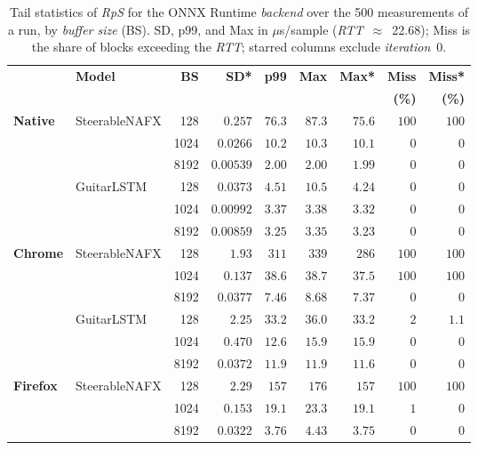 \begin{table}[htbp]
\caption{Tail statistics of \emph{RpS} for the ONNX Runtime \emph{backend} over the 500 measurements of a run, by \emph{buffer size} (BS). SD, p99, and Max in $\mu$s/sample (\emph{RTT}~$\approx$~22.68); Miss is the share of blocks exceeding the \emph{RTT}; starred columns exclude \emph{iteration}~0.}
\label{tab:tails}
\centering
\setlength{\tabcolsep}{2pt}
\begin{tabular}{llrrrrrrr}
\toprule
& \textbf{Model} & \textbf{BS} & \textbf{SD*} & \textbf{p99} & \textbf{Max} & \textbf{Max*} & \textbf{Miss} & \textbf{Miss*} \\
& & & & & & & \textbf{(\%)} & \textbf{(\%)} \\
\midrule
  \multirow{6}{*}{\textbf{Native}} & \multirow{3}{*}{SteerableNAFX} & 128 & $0.257$ & $76.3$ & $87.3$ & $75.6$ & $100$ & $100$ \\
   &  & 1024 & $0.0266$ & $10.2$ & $10.3$ & $10.1$ & $0$ & $0$ \\
   &  & 8192 & $0.00539$ & $2.00$ & $2.00$ & $1.99$ & $0$ & $0$ \\
   & \multirow{3}{*}{GuitarLSTM} & 128 & $0.0373$ & $4.51$ & $10.5$ & $4.24$ & $0$ & $0$ \\
   &  & 1024 & $0.00992$ & $3.37$ & $3.38$ & $3.32$ & $0$ & $0$ \\
   &  & 8192 & $0.00859$ & $3.25$ & $3.35$ & $3.23$ & $0$ & $0$ \\
\midrule
  \multirow{6}{*}{\textbf{Chrome}} & \multirow{3}{*}{SteerableNAFX} & 128 & $1.93$ & $311$ & $339$ & $286$ & $100$ & $100$ \\
   &  & 1024 & $0.137$ & $38.6$ & $38.7$ & $37.5$ & $100$ & $100$ \\
   &  & 8192 & $0.0377$ & $7.46$ & $8.68$ & $7.37$ & $0$ & $0$ \\
   & \multirow{3}{*}{GuitarLSTM} & 128 & $2.25$ & $33.2$ & $36.0$ & $33.2$ & $2$ & $1.1$ \\
   &  & 1024 & $0.470$ & $12.6$ & $15.9$ & $15.9$ & $0$ & $0$ \\
   &  & 8192 & $0.0372$ & $11.9$ & $11.9$ & $11.6$ & $0$ & $0$ \\
\midrule
  \multirow{6}{*}{\textbf{Firefox}} & \multirow{3}{*}{SteerableNAFX} & 128 & $2.29$ & $157$ & $176$ & $157$ & $100$ & $100$ \\
   &  & 1024 & $0.153$ & $19.1$ & $23.3$ & $19.1$ & $1$ & $0$ \\
   &  & 8192 & $0.0322$ & $3.76$ & $4.43$ & $3.75$ & $0$ & $0$ \\

\end{tabular}
\end{table}
